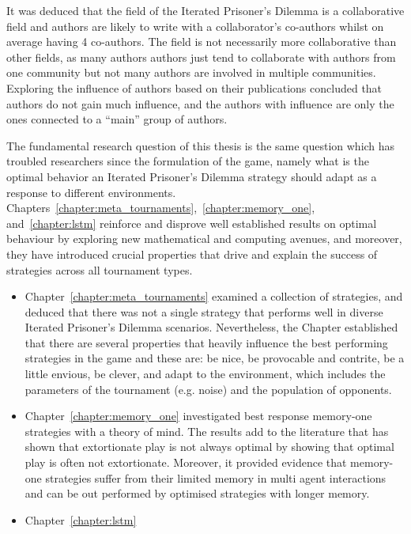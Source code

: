 It was deduced that the field of the Iterated Prisoner's Dilemma is a
collaborative field and authors are likely to write with a collaborator's
co-authors whilst on average having 4 co-authors. The field is not
necessarily more collaborative than other fields, as many authors authors just
tend to collaborate with authors from one community but not many authors are
involved in multiple communities. Exploring the influence of authors based on
their publications concluded that authors do not gain much influence, and the
authors with influence are only the ones connected to a ``main'' group of
authors.

The fundamental research question of this thesis is the same question which has
troubled researchers since the formulation of the game, namely what is the
optimal behavior an Iterated Prisoner's Dilemma strategy should adapt as a
response to different environments.
Chapters~\ref{chapter:meta_tournaments},~\ref{chapter:memory_one},
and~\ref{chapter:lstm} reinforce and disprove well established results on optimal
behaviour by
exploring new mathematical and computing avenues, and moreover, they have introduced
crucial properties that drive and explain the success of strategies across all
tournament types.

\begin{itemize}
    \item Chapter~\ref{chapter:meta_tournaments} examined a collection of
    \numberofstrategies strategies, and deduced that there was not a single
    strategy that performs well in diverse Iterated Prisoner’s Dilemma
    scenarios. Nevertheless, the Chapter established that there are several
    properties that heavily influence the best performing strategies in the game
    and these are: be nice, be provocable and contrite, be a little envious, be
    clever, and adapt to the environment, which includes the parameters of the
    tournament (e.g. noise) and the population of opponents.
    \item Chapter~\ref{chapter:memory_one} investigated best response memory-one
    strategies with a theory of mind. The results add to the 
    literature that has shown that extortionate play is not always optimal by
    showing that optimal play is often not extortionate. Moreover, it provided
    evidence that memory-one strategies suffer from their limited memory in
    multi agent interactions and can be out performed by optimised strategies
    with longer memory.
    \item Chapter~\ref{chapter:lstm} %
\end{itemize}

